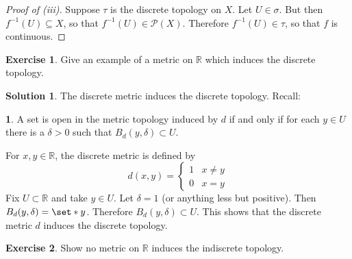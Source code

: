 \documentclass[11pt]{article}
\numberwithin{equation}{section}
\newcounter{theo}[section]\setcounter{theo}{0}
\theoremstyle{definition}
\newtheorem{claim}{\color{ForestGreen}{\textbf{Claim}}}[section]
\theoremstyle{definition}
\newtheorem*{solution}{\color{Goldenrod}Solution}
\newtheorem{exercise}{\color{YellowOrange}Exercise}[section]
\newcommand\inv[1]{#1^{-1}}
\def\Set{\set*}%
\def\ss{\subset}
\def\sse{\subseteq}
\newcommand{\1}{\mathbbm 1}
\def\d{\delta}
\def\t{\tau}
\newcommand{\RR}{\mathbb R}
\newcommand{\pP}{\mathcal P}
\begin{document}
\begin{proof}[Proof of (iii)]
	Suppose $\t$ is the discrete topology on $X$. Let $U \in \sigma$. But then $\inv{f}(U) \sse X$, so that $\inv{f}(U) \in \pP(X)$. Therefore $\inv{f}(U) \in \t$, so that $f$ is continuous. 
\end{proof}

\begin{exercise}
	Give an example of a metric on $\RR$ which induces the discrete topology. 
\end{exercise}
\begin{solution}
	The discrete metric induces the discrete topology. Recall:
	\begin{claim}
		A set is open in the metric topology induced by $d$ if and only if for each $y \in U$ there is a $\d > 0$ such that $B_d(y, \d) \ss U$.
	\end{claim}
	For $x,y \in \RR$, the discrete metric is defined by
	\begin{equation}
		d(x,y) = 
		\begin{cases}
			1 & x \neq y \\
			0 & x = y
		\end{cases}
	\end{equation}
	Fix $U \ss \RR$ and take $y \in U$. Let $\d = 1$ (or anything less but positive). Then $B_d(y,\d) = \Set{y}$. Therefore $B_d(y,\d) \ss U$. This shows that the discrete metric $d$ induces the discrete topology. 
\end{solution}


\begin{exercise}
	Show no metric on $\RR$ induces the indiscrete topology.
\end{exercise}
\end{document}
